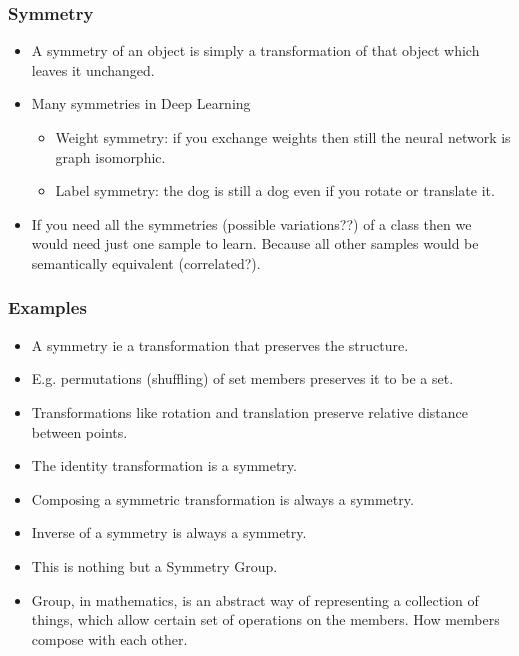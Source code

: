 \begin{frame}[fragile]\frametitle{Symmetry}

\begin{itemize}
\item  A symmetry of an object is simply a transformation of that object which leaves it unchanged.
\item Many symmetries in Deep Learning
\begin{itemize}
\item Weight symmetry: if you exchange weights then still the neural network is graph isomorphic.
\item Label symmetry: the dog is still a dog even if you rotate or translate it.
\end{itemize}
\item If you need all the symmetries (possible variations??) of a class then we would need just one sample to learn. Because all other samples would be semantically equivalent (correlated?).
\end{itemize}


\end{frame}

\begin{frame}[fragile]\frametitle{Examples}

\begin{itemize}
\item A symmetry ie a transformation that preserves the structure.
\item E.g. permutations (shuffling) of set members preserves it to be a set.
\item Transformations like rotation and translation preserve relative distance between points.
\item The identity transformation is a symmetry.
\item Composing a symmetric transformation is always a symmetry.
\item Inverse of a symmetry is always a symmetry.
\item This is nothing but a Symmetry Group. 
\item Group, in mathematics, is an abstract way of representing a collection of things, which allow certain set of operations on the members. How members compose with each other.
\end{itemize}
	
\end{frame}



